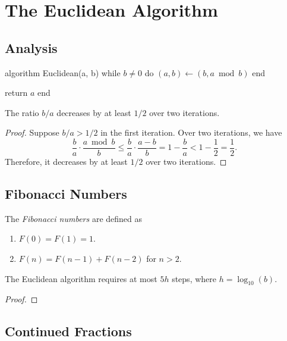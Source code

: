 \chapter{The Euclidean Algorithm}

\section{Analysis}

\begin{Pseudocode}
algorithm Euclidean(a, b)
  while $b ≠ 0$ do
    $(a, b) ← (b, a \bmod b)$
  end

  return $a$
end
\end{Pseudocode}

\begin{proposition}
  The ratio $b/a$ decreases by at least $1/2$ over two iterations.
\end{proposition}

\begin{proof}
  Suppose $b/a > 1/2$ in the first iteration.
  Over two iterations, we have
  \[
    \frac{b}{a} · \frac{a \bmod b}{b}
    ≤ \frac{b}{a} · \frac{a - b}{b}
    = 1 - \frac{b}{a}
    < 1 - \frac{1}{2}
    = \frac{1}{2}.
  \]
  Therefore, it decreases by at least $1/2$ over two iterations.
\end{proof}

\section{Fibonacci Numbers}

\begin{definition}
  The \emph{Fibonacci numbers} are defined as
  \begin{enumerate}
    \item $F(0) = F(1) = 1$.
    \item $F(n) = F(n - 1) + F(n - 2)$ for $n > 2$.
  \end{enumerate}
\end{definition}

\begin{proposition}
  The Euclidean algorithm requires at most $5h$ steps,
  where $h = \log_{10}(b)$.
\end{proposition}

\begin{proof}
\end{proof}

\section{Continued Fractions}

